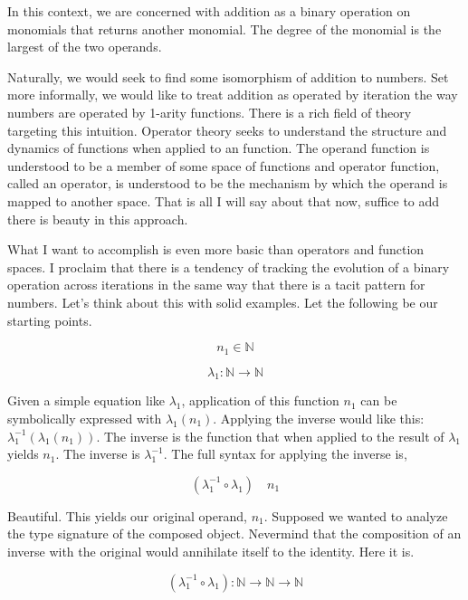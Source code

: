 In this context, we are concerned with addition as a binary operation on
monomials that returns another monomial. The degree of the monomial is the
largest of the two operands.

Naturally, we would seek to find some isomorphism of addition to numbers. Set
more informally, we would like to treat addition as operated by iteration the
way numbers are operated by 1-arity functions. There is a rich field of theory
targeting this intuition. Operator theory seeks to understand the structure and
dynamics of functions when applied to an function. The operand function is
understood to be a member of some space of functions and operator function,
called an operator, is understood to be the mechanism by which the operand is
mapped to another space. That is all I will say about that now, suffice to add
there is beauty in this approach.

What I want to accomplish is even more basic than operators and function
spaces. I proclaim that there is a tendency of tracking the evolution of a
binary operation across iterations in the same way that there is a tacit
pattern for numbers. Let's think about this with solid examples. Let the
following be our starting points.

\begin{equation}
    n_1 \in \mathbb{N}
\end{equation}

\begin{equation}
    \lambda_1: \mathbb{N} \rightarrow \mathbb{N}
\end{equation}

Given a simple equation like $\lambda_1$, application of this function $n_1$
can be symbolically expressed with $\lambda_1(n_1)$. Applying the inverse would
like this: $\lambda_1^{-1}(\lambda_1(n_1))$. The inverse is the function that
when applied to the result of $\lambda_1$ yields $n_1$. The inverse is
$\lambda_1^{-1}$. The full syntax for applying the inverse is,

\begin{equation}
    (\lambda_1^{-1} \circ \lambda_1) \quad n_1
\end{equation}

Beautiful. This yields our original operand, $n_1$. Supposed we wanted to
analyze the type signature of the composed object. Nevermind that the
composition of an inverse with the original would annihilate itself to the
identity. Here it is.

\begin{equation}
    (\lambda_1^{-1} \circ \lambda_1): \mathbb{N} \rightarrow \mathbb{N} \rightarrow \mathbb{N}
    \label{eq:comp}
\end{equation}

